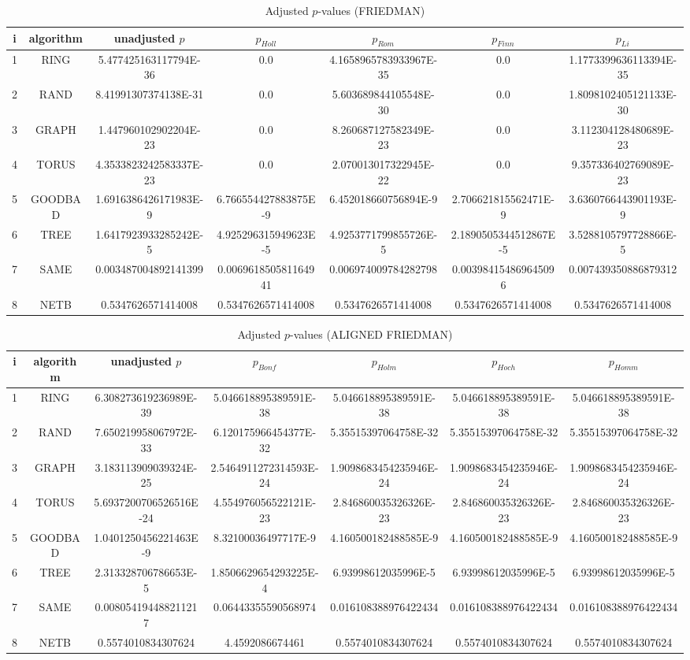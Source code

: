 \documentclass[a4paper,10pt]{article}
\begin{document}
\begin{landscape}
\begin{table}[!htp]
\centering\scriptsize
\caption{Adjusted $p$-values (FRIEDMAN)}
\begin{tabular}{ccccccc}
i&algorithm&unadjusted $p$&$p_{Holl}$&$p_{Rom}$&$p_{Finn}$&$p_{Li}$\\
\hline
1& RING&5.477425163117794E-36&0.0&4.1658965783933967E-35&0.0&1.1773399636113394E-35\\
2& RAND&8.41991307374138E-31&0.0&5.603689844105548E-30&0.0&1.8098102405121133E-30\\
3& GRAPH&1.447960102902204E-23&0.0&8.260687127582349E-23&0.0&3.112304128480689E-23\\
4& TORUS&4.3533823242583337E-23&0.0&2.070013017322945E-22&0.0&9.357336402769089E-23\\
5& GOODBAD&1.6916386426171983E-9&6.766554427883875E-9&6.452018660756894E-9&2.706621815562471E-9&3.6360766443901193E-9\\
6& TREE&1.6417923933285242E-5&4.925296315949623E-5&4.9253771799855726E-5&2.1890505344512867E-5&3.5288105797728866E-5\\
7& SAME&0.003487004892141399&0.006961850581164941&0.006974009784282798&0.003984154869645096&0.007439350886879312\\
8& NETB&0.5347626571414008&0.5347626571414008&0.5347626571414008&0.5347626571414008&0.5347626571414008\\
\hline
\end{tabular}
\end{table}


\newpage

\begin{table}[!htp]
\centering\scriptsize
\caption{Adjusted $p$-values (ALIGNED FRIEDMAN)}
\begin{tabular}{ccccccc}
i&algorithm&unadjusted $p$&$p_{Bonf}$&$p_{Holm}$&$p_{Hoch}$&$p_{Homm}$\\
\hline
1& RING&6.308273619236989E-39&5.046618895389591E-38&5.046618895389591E-38&5.046618895389591E-38&5.046618895389591E-38\\
2& RAND&7.650219958067972E-33&6.120175966454377E-32&5.35515397064758E-32&5.35515397064758E-32&5.35515397064758E-32\\
3& GRAPH&3.183113909039324E-25&2.5464911272314593E-24&1.9098683454235946E-24&1.9098683454235946E-24&1.9098683454235946E-24\\
4& TORUS&5.6937200706526516E-24&4.554976056522121E-23&2.846860035326326E-23&2.846860035326326E-23&2.846860035326326E-23\\
5& GOODBAD&1.0401250456221463E-9&8.32100036497717E-9&4.160500182488585E-9&4.160500182488585E-9&4.160500182488585E-9\\
6& TREE&2.313328706786653E-5&1.8506629654293225E-4&6.93998612035996E-5&6.93998612035996E-5&6.93998612035996E-5\\
7& SAME&0.008054194488211217&0.06443355590568974&0.016108388976422434&0.016108388976422434&0.016108388976422434\\
8& NETB&0.5574010834307624&4.4592086674461&0.5574010834307624&0.5574010834307624&0.5574010834307624\\
\hline
\end{tabular}
\end{table}


\end{landscape}
\end{document}
